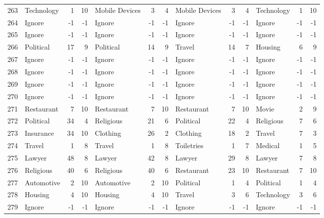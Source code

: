 \begin{figure}[htbp]
\begin{tabular}{rlrrlrrlrrlrr}
    263   & Technology & 1     & 10    & Mobile Devices & 3     & 4     & Mobile Devices & 3     & 4     & Technology & 1     & 10 \\
    264   & Ignore & -1    & -1    & Ignore & -1    & -1    & Ignore & -1    & -1    & Ignore & -1    & -1 \\
    265   & Ignore & -1    & -1    & Ignore & -1    & -1    & Ignore & -1    & -1    & Ignore & -1    & -1 \\
    266   & Political & 17    & 9     & Political & 14    & 9     & Travel & 14    & 7     & Housing & 6     & 9 \\
    267   & Ignore & -1    & -1    & Ignore & -1    & -1    & Ignore & -1    & -1    & Ignore & -1    & -1 \\
    268   & Ignore & -1    & -1    & Ignore & -1    & -1    & Ignore & -1    & -1    & Ignore & -1    & -1 \\
    269   & Ignore & -1    & -1    & Ignore & -1    & -1    & Ignore & -1    & -1    & Ignore & -1    & -1 \\
    270   & Ignore & -1    & -1    & Ignore & -1    & -1    & Ignore & -1    & -1    & Ignore & -1    & -1 \\
    271   & Restaurant & 7     & 10    & Restaurant & 7     & 10    & Restaurant & 7     & 10    & Movie & 2     & 9 \\
    272   & Political & 34    & 4     & Religious & 21    & 6     & Political & 22    & 4     & Religious & 7     & 6 \\
    273   & Insurance & 34    & 10    & Clothing & 26    & 2     & Clothing & 18    & 2     & Travel & 7     & 3 \\
    274   & Travel & 1     & 8     & Travel & 1     & 8     & Toiletries & 1     & 7     & Medical & 1     & 5 \\
    275   & Lawyer & 48    & 8     & Lawyer & 42    & 8     & Lawyer & 29    & 8     & Lawyer & 7     & 8 \\
    276   & Religious & 40    & 6     & Religious & 40    & 6     & Restaurant & 23    & 10    & Restaurant & 7     & 10 \\
    277   & Automotive & 2     & 10    & Automotive & 2     & 10    & Political & 1     & 4     & Political & 1     & 4 \\
    278   & Housing & 4     & 10    & Housing & 4     & 10    & Travel & 3     & 6     & Technology & 3     & 6 \\
    279   & Ignore & -1    & -1    & Ignore & -1    & -1    & Ignore & -1    & -1    & Ignore & -1    & -1 \\

\end{tabular}
\end{figure}
